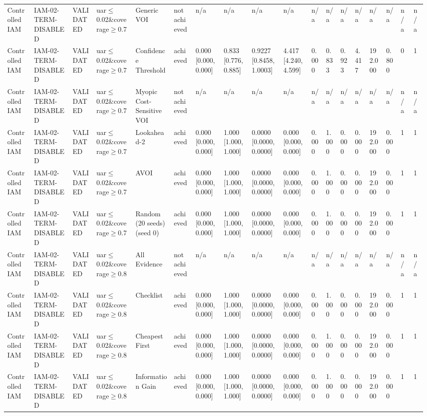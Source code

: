 \begin{table}[!ht]
{\begin{tabular}{llllllllllllllllll}
Controlled IAM & IAM-02-TERM-DISABLED & VALIDATED & uar$\le$0.02\&coverage$\ge$0.7 & Generic VOI & not achieved & n/a & n/a & n/a & n/a & n/a & n/a & n/a & n/a & n/a & n/a & n/a & n/a \\
Controlled IAM & IAM-02-TERM-DISABLED & VALIDATED & uar$\le$0.02\&coverage$\ge$0.7 & Confidence Threshold & achieved & 0.000 [0.000, 0.000] & 0.833 [0.776, 0.885] & 0.9227 [0.8458, 1.0003] & 4.417 [4.240, 4.599] & 0.000 & 0.833 & 0.923 & 4.417 & 192.000 & 0.800 & 0 & 1 \\
Controlled IAM & IAM-02-TERM-DISABLED & VALIDATED & uar$\le$0.02\&coverage$\ge$0.7 & Myopic Cost-Sensitive VOI & not achieved & n/a & n/a & n/a & n/a & n/a & n/a & n/a & n/a & n/a & n/a & n/a & n/a \\
Controlled IAM & IAM-02-TERM-DISABLED & VALIDATED & uar$\le$0.02\&coverage$\ge$0.7 & Lookahead-2 & achieved & 0.000 [0.000, 0.000] & 1.000 [1.000, 1.000] & 0.0000 [0.0000, 0.0000] & 0.000 [0.000, 0.000] & 0.000 & 1.000 & 0.000 & 0.000 & 192.000 & 0.000 & 1 & 1 \\
Controlled IAM & IAM-02-TERM-DISABLED & VALIDATED & uar$\le$0.02\&coverage$\ge$0.7 & AVOI & achieved & 0.000 [0.000, 0.000] & 1.000 [1.000, 1.000] & 0.0000 [0.0000, 0.0000] & 0.000 [0.000, 0.000] & 0.000 & 1.000 & 0.000 & 0.000 & 192.000 & 0.000 & 1 & 1 \\
Controlled IAM & IAM-02-TERM-DISABLED & VALIDATED & uar$\le$0.02\&coverage$\ge$0.7 & Random (20 seeds) (seed 0) & achieved & 0.000 [0.000, 0.000] & 1.000 [1.000, 1.000] & 0.0000 [0.0000, 0.0000] & 0.000 [0.000, 0.000] & 0.000 & 1.000 & 0.000 & 0.000 & 192.000 & 0.000 & 1 & 1 \\
Controlled IAM & IAM-02-TERM-DISABLED & VALIDATED & uar$\le$0.02\&coverage$\ge$0.8 & All Evidence & not achieved & n/a & n/a & n/a & n/a & n/a & n/a & n/a & n/a & n/a & n/a & n/a & n/a \\
Controlled IAM & IAM-02-TERM-DISABLED & VALIDATED & uar$\le$0.02\&coverage$\ge$0.8 & Checklist & achieved & 0.000 [0.000, 0.000] & 1.000 [1.000, 1.000] & 0.0000 [0.0000, 0.0000] & 0.000 [0.000, 0.000] & 0.000 & 1.000 & 0.000 & 0.000 & 192.000 & 0.000 & 1 & 1 \\
Controlled IAM & IAM-02-TERM-DISABLED & VALIDATED & uar$\le$0.02\&coverage$\ge$0.8 & Cheapest First & achieved & 0.000 [0.000, 0.000] & 1.000 [1.000, 1.000] & 0.0000 [0.0000, 0.0000] & 0.000 [0.000, 0.000] & 0.000 & 1.000 & 0.000 & 0.000 & 192.000 & 0.000 & 1 & 1 \\
Controlled IAM & IAM-02-TERM-DISABLED & VALIDATED & uar$\le$0.02\&coverage$\ge$0.8 & Information Gain & achieved & 0.000 [0.000, 0.000] & 1.000 [1.000, 1.000] & 0.0000 [0.0000, 0.0000] & 0.000 [0.000, 0.000] & 0.000 & 1.000 & 0.000 & 0.000 & 192.000 & 0.000 & 1 & 1 \\

\end{tabular}}
\end{table}
